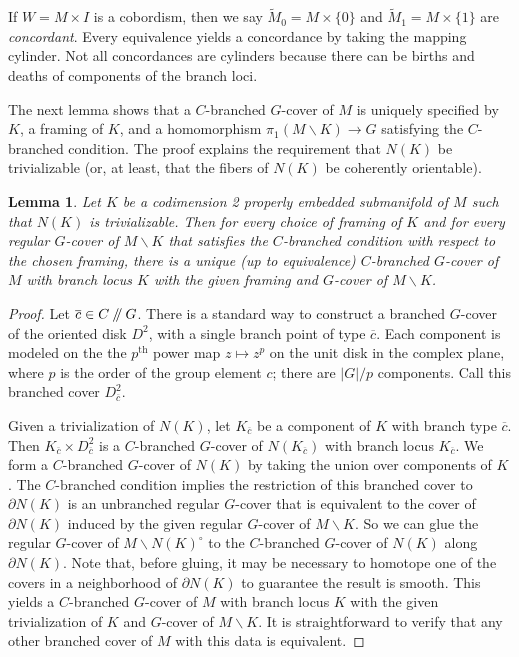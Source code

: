 \documentclass[10pt,twocolumn,amsmath,amssymb,aps,pra,secnumarabic,
    nofootinbib,groupedaddress]{revtex4-1}
\newtheorem{lemma}[theorem]{Lemma}
\renewcommand{\setminus}{\smallsetminus}
\newcommand{\sslash}{\mathbin{/\mkern-5mu/}}
\begin{document}
If $W = M \times I$ is a cobordism, then we say $\tilde{M}_0 = M \times \{0\}$ and $\tilde{M}_1 = M \times \{1\}$ are \emph{concordant}.  Every equivalence yields a concordance by taking the mapping cylinder. Not all concordances are cylinders because there can be births and deaths of components of the branch loci.

The next lemma shows that a $C$-branched $G$-cover of $M$ is uniquely specified by $K$, a framing of $K$, and a homomorphism $\pi_1(M \setminus K) \to G$ satisfying the $C$-branched condition.  The proof explains the requirement that $N(K)$ be trivializable (or, at least, that the fibers of $N(K)$ be coherently orientable).

\begin{lemma}
Let $K$ be a codimension 2 properly embedded submanifold of $M$ such that $N(K)$ is trivializable.  Then for every choice of framing of $K$ and for every regular $G$-cover of $M \setminus K$ that satisfies the $C$-branched condition with respect to the chosen framing, there is a unique (up to equivalence) $C$-branched $G$-cover of $M$ with branch locus $K$ with the given framing and $G$-cover of $M \setminus K$.
\label{l:extension}
\end{lemma}

\begin{proof}
Let $\overline{c} \in C\sslash G$.  There is a standard way to construct a branched $G$-cover of the oriented disk $D^2$, with a single branch point of type $\overline{c}$.  Each component is modeled on the the $p^{\text{th}}$ power map $z \mapsto z^p$ on the unit disk in the complex plane, where $p$ is the order of the group element $c$; there are $|G|/p$ components.  Call this branched cover $D_{\overline{c}}^2$.

Given a trivialization of $N(K)$, let $K_{\overline{c}}$ be a component of $K$ with branch type $\overline{c}$.  Then $K_{\overline{c}} \times D_{\overline{c}}^2$ is a $C$-branched $G$-cover of $N(K_{\overline{c}})$ with branch locus $K_{\overline{c}}$.  We form a $C$-branched $G$-cover of $N(K)$ by taking the union over components of $K$.  The $C$-branched condition implies the restriction of this branched cover to $\partial N(K)$ is an unbranched regular $G$-cover that is equivalent to the cover of $\partial N(K)$ induced by the given regular $G$-cover of $M\setminus K$.  So we can glue the regular $G$-cover of $M \setminus N(K)^\circ$ to the $C$-branched $G$-cover of $N(K)$ along $\partial N(K)$.  Note that, before gluing, it may be necessary to homotope one of the covers in a neighborhood of $\partial N(K)$ to guarantee the result is smooth.  This yields a $C$-branched $G$-cover of $M$ with branch locus $K$ with the given trivialization of $K$ and $G$-cover of $M \setminus K$.  It is straightforward to verify that any other branched cover of $M$ with this data is equivalent.
\end{proof}
\end{document}
